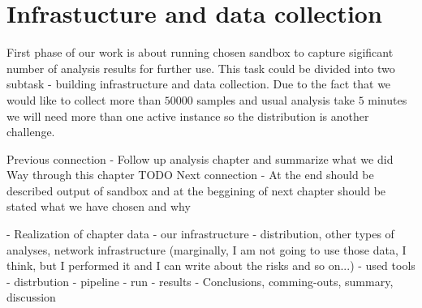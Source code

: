 \chapter{Infrastucture and data collection}
First phase of our work is about running chosen sandbox to capture sigificant number of analysis results for further use. This task could be divided into two subtask - building infrastructure and data collection. Due to the fact that we would like to collect more than $50 000$ samples and usual analysis take $5$ minutes we will need more than one active instance so the distribution is another challenge.



Previous connection
- Follow up analysis chapter and summarize what we did
Way through this chapter
TODO
Next connection
- At the end should be described output of sandbox and at the beggining of next chapter should be stated what we have chosen and why



- Realization of chapter data 
- our infrastructure - distribution, other types of analyses, network infrastructure (marginally, I am not going to use those data, I think, but I performed it and I can write about the risks and so on...)
- used tools
- distrbution
- pipeline
- run
- results
- Conclusions, comming-outs, summary, discussion